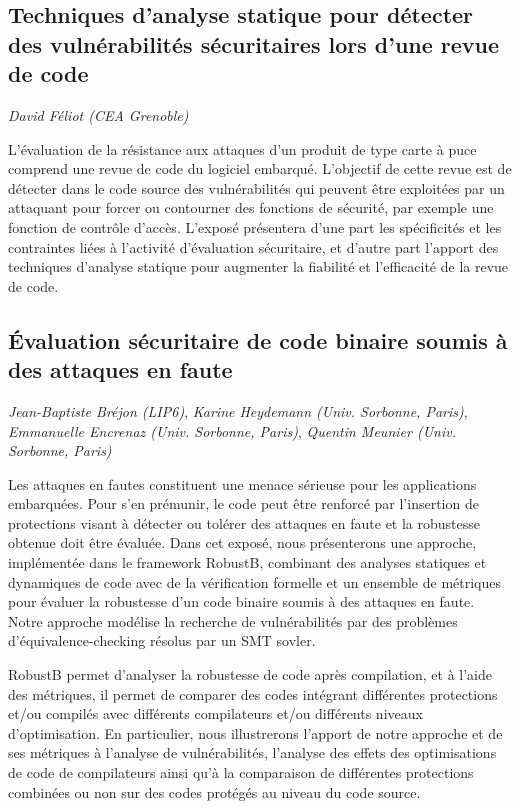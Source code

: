 \documentclass[a4paper,11pt]{article}
\begin{document}
\subsection{Techniques d'analyse statique pour détecter des vulnérabilités sécuritaires lors d'une revue de code}
\label{sec:org0bcbeb6}
\emph{David Féliot (CEA Grenoble)}

L'évaluation de la résistance aux attaques d'un produit de type carte à puce comprend une revue de code du logiciel embarqué. L'objectif de cette revue est de détecter dans le code source des vulnérabilités qui peuvent être exploitées par un attaquant pour forcer ou contourner des fonctions de sécurité, par exemple une fonction de contrôle d'accès. L'exposé présentera d'une part les spécificités et les contraintes liées à l'activité d'évaluation sécuritaire, et d'autre part l'apport des techniques d'analyse statique pour augmenter la fiabilité et l'efficacité de la revue de code.

\subsection{Évaluation sécuritaire de code binaire soumis à des attaques en faute}
\label{sec:org89850c6}
\emph{Jean-Baptiste Bréjon (LIP6)},
\emph{Karine Heydemann (Univ. Sorbonne, Paris)},
\emph{Emmanuelle Encrenaz (Univ. Sorbonne, Paris)},
\emph{Quentin Meunier (Univ. Sorbonne, Paris)}

Les attaques en fautes constituent une menace sérieuse pour les
applications embarquées. Pour s’en prémunir, le code peut être
renforcé par l’insertion de protections visant à détecter ou tolérer
des attaques en faute et la robustesse obtenue doit être évaluée. Dans
cet exposé, nous présenterons une approche, implémentée dans le
framework RobustB, combinant des analyses statiques et dynamiques de
code avec de la vérification formelle et un ensemble de métriques pour
évaluer la robustesse d'un code binaire soumis à des attaques en
faute. Notre approche modélise la recherche de vulnérabilités par des
problèmes d'équivalence-checking résolus par un SMT sovler.

RobustB permet d’analyser la robustesse de code après compilation, et
à l’aide des métriques, il permet de comparer des codes intégrant
différentes protections et/ou compilés avec différents compilateurs
et/ou différents niveaux d’optimisation. En particulier, nous
illustrerons l’apport de notre approche et de ses métriques à
l'analyse de vulnérabilités, l'analyse des effets des optimisations de
code de compilateurs ainsi qu'à la comparaison de différentes
protections combinées ou non sur des codes protégés au niveau du code
source.
\end{document}
